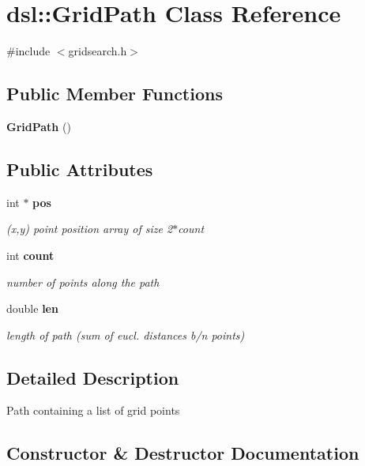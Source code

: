 \section{dsl\-:\-:\-Grid\-Path \-Class \-Reference}
\label{classdsl_1_1GridPath}


{\ttfamily \#include $<$gridsearch.\-h$>$}

\subsection*{\-Public \-Member \-Functions}
\begin{DoxyCompactItemize}
\item 
{\bf \-Grid\-Path} ()
\end{DoxyCompactItemize}
\subsection*{\-Public \-Attributes}
\begin{DoxyCompactItemize}
\item 
int $\ast$ {\bf pos}
\begin{DoxyCompactList}\small\item\em (x,y) point position array of size 2$\ast$count \end{DoxyCompactList}\item 
int {\bf count}
\begin{DoxyCompactList}\small\item\em number of points along the path \end{DoxyCompactList}\item 
double {\bf len}
\begin{DoxyCompactList}\small\item\em length of path (sum of eucl. distances b/n points) \end{DoxyCompactList}\end{DoxyCompactItemize}


\subsection{\-Detailed \-Description}
\-Path containing a list of grid points 

\subsection{\-Constructor \& \-Destructor \-Documentation}

